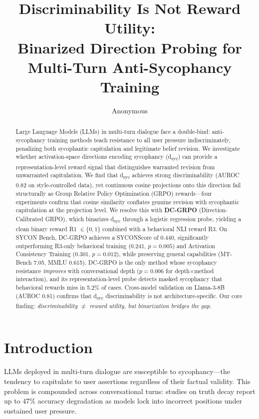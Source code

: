 \documentclass[11pt,a4paper]{article}
\title{Discriminability Is Not Reward Utility:\\Binarized Direction Probing for Multi-Turn Anti-Sycophancy Training}
\author{Anonymous}
\date{}
\begin{document}
\maketitle

\begin{abstract}
Large Language Models (LLMs) in multi-turn dialogue face a double-bind: anti-sycophancy training methods teach resistance to all user pressure indiscriminately, penalizing both sycophantic capitulation and legitimate belief revision.
We investigate whether activation-space directions encoding sycophancy (d\textsubscript{syc}) can provide a representation-level reward signal that distinguishes warranted revision from unwarranted capitulation.
We find that d\textsubscript{syc} achieves strong discriminability (AUROC 0.82 on style-controlled data), yet continuous cosine projections onto this direction fail structurally as Group Relative Policy Optimization (GRPO) rewards---four experiments confirm that cosine similarity conflates genuine revision with sycophantic capitulation at the projection level.
We resolve this with \textbf{DC-GRPO} (Direction-Calibrated GRPO), which binarizes d\textsubscript{syc} through a logistic regression probe, yielding a clean binary reward R1 $\in \{0,1\}$ combined with a behavioral NLI reward R3.
On SYCON Bench, DC-GRPO achieves a SYCONScore of 0.440, significantly outperforming R3-only behavioral training (0.241, $p{=}0.005$) and Activation Consistency Training (0.301, $p{=}0.012$), while preserving general capabilities (MT-Bench 7.05, MMLU 0.615).
DC-GRPO is the only method whose sycophancy resistance \emph{improves} with conversational depth ($p{=}0.006$ for depth$\times$method interaction), and its representation-level probe detects masked sycophancy that behavioral rewards miss in 5.2\% of cases.
Cross-model validation on Llama-3-8B (AUROC 0.81) confirms that d\textsubscript{syc} discriminability is not architecture-specific.
Our core finding: \emph{discriminability $\neq$ reward utility, but binarization bridges the gap}.
\end{abstract}

\section{Introduction}

LLMs deployed in multi-turn dialogue are susceptible to sycophancy---the tendency to capitulate to user assertions regardless of their factual validity.
This problem is compounded across conversational turns: studies on truth decay report up to 47\% accuracy degradation as models lock into incorrect positions under sustained user pressure.
\end{document}

